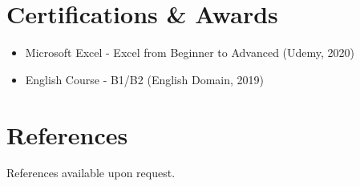 \documentclass[11pt]{article}
\begin{document}
\section{Certifications \& Awards}
\begin{itemize}
    \item[\checkmark] Microsoft Excel - Excel from Beginner to Advanced (Udemy, 2020)
    \item[\checkmark] English Course - B1/B2 (English Domain, 2019)
\end{itemize}
\section{References}
\textcolor{Sepia}{References available upon request.}
\end{document}
